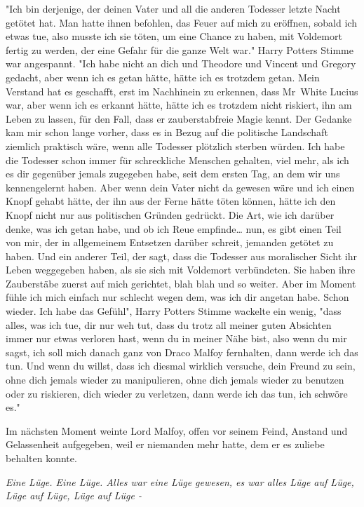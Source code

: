 {"Ich bin derjenige, der deinen Vater und all die anderen Todesser letzte Nacht getötet hat. Man hatte ihnen befohlen, das Feuer auf mich zu eröffnen, sobald ich etwas tue, also musste ich sie töten, um eine Chance zu haben, mit Voldemort fertig zu werden, der eine Gefahr für die ganze Welt war." Harry Potters Stimme war angespannt. "Ich habe nicht an dich und Theodore und Vincent und Gregory gedacht, aber wenn ich es getan hätte, hätte ich es trotzdem getan. Mein Verstand hat es geschafft, erst im Nachhinein zu erkennen, dass Mr~White Lucius war, aber wenn ich es erkannt hätte, hätte ich es trotzdem nicht riskiert, ihn am Leben zu lassen, für den Fall, dass er zauberstabfreie Magie kennt. Der Gedanke kam mir schon lange vorher, dass es in Bezug auf die politische Landschaft ziemlich praktisch wäre, wenn alle Todesser plötzlich sterben würden. Ich habe die Todesser schon immer für schreckliche Menschen gehalten, viel mehr, als ich es dir gegenüber jemals zugegeben habe, seit dem ersten Tag, an dem wir uns kennengelernt haben. Aber wenn dein Vater nicht da gewesen wäre und ich einen Knopf gehabt hätte, der ihn aus der Ferne hätte töten können, hätte ich den Knopf nicht nur aus politischen Gründen gedrückt. Die Art, wie ich darüber denke, was ich getan habe, und ob ich Reue empfinde… nun, es gibt einen Teil von mir, der in allgemeinem Entsetzen darüber schreit, jemanden getötet zu haben. Und ein anderer Teil, der sagt, dass die Todesser aus moralischer Sicht ihr Leben weggegeben haben, als sie sich mit Voldemort verbündeten. Sie haben ihre Zauberstäbe zuerst auf mich gerichtet, blah blah und so weiter. Aber im Moment fühle ich mich einfach nur schlecht wegen dem, was ich dir angetan habe. Schon wieder. Ich habe das Gefühl", Harry Potters Stimme wackelte ein wenig, "dass alles, was ich tue, dir nur weh tut, dass du trotz all meiner guten Absichten immer nur etwas verloren hast, wenn du in meiner Nähe bist, also wenn du mir sagst, ich soll mich danach ganz von Draco Malfoy fernhalten, dann werde ich das tun. Und wenn du willst, dass ich diesmal wirklich versuche, dein Freund zu sein, ohne dich jemals wieder zu manipulieren, ohne dich jemals wieder zu benutzen oder zu riskieren, dich wieder zu verletzen, dann werde ich das tun, ich schwöre es."

Im nächsten Moment weinte Lord Malfoy, offen vor seinem Feind, Anstand und Gelassenheit aufgegeben, weil er niemanden mehr hatte, dem er es zuliebe behalten konnte.

\emph{Eine Lüge. Eine Lüge. Alles war eine Lüge gewesen, es war alles Lüge auf Lüge, Lüge auf Lüge, Lüge auf Lüge -}

}
